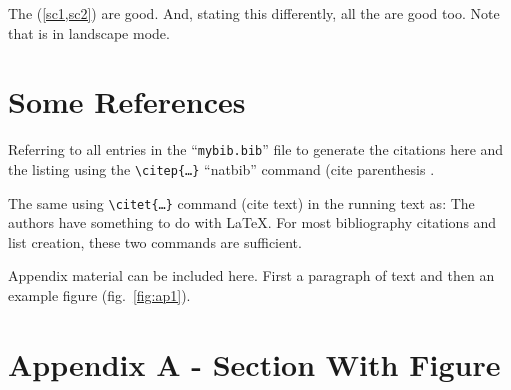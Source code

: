 \documentclass[ms-thesis,mathdesign,12pt,showgrid]{ndsu-thesis-2022}
\begin{document}
\voh
\kant[2]\kant[9]

The (\cref{sc1,sc2}) are good. And, stating this differently, all the  are good too. Note that  is in landscape mode.


\kant[9-10] \kant[9]

\mysectop%
\section{Some References}
Referring to all entries in the ``\texttt{mybib.bib}'' file to generate the citations here and the listing using the \texttt{\textbackslash citep\{\ldots\}} ``natbib'' command (cite parenthesis \citep{texbook,lcompanion,latex2e,knuth1984,lesk1977,amsthm2017,calvo2004using,cannayen2011latex,kopka2004guide,notso2021,bari2016identification}.

The same using \texttt{\textbackslash citet\{\ldots\}} command (cite text) in the running text as: The authors \citet{texbook,lcompanion,latex2e,knuth1984,lesk1977,amsthm2017,calvo2004using,cannayen2011latex,kopka2004guide,notso2021,bari2016identification} have something to do with \LaTeX. For most bibliography citations and list creation, these two commands are sufficient.


\makerefs %


Appendix material can be included here. First a paragraph of text and then an example figure (fig.~\ref{fig:ap1}).

\section{Appendix A - Section With Figure}
\kant[9]

\vo
{}	
\end{document}
